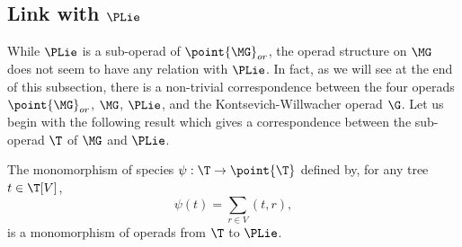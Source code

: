 \subsection{Link with \texorpdfstring{$\PLie$}{PLie}}
While $\PLie$ is a sub-operad of $\point{\MG}_{or}$, the operad structure on $\MG$ does not seem to have any 
relation with $\PLie$. In fact, as we will see at the end of this subsection, there is a non-trivial 
correspondence between the four operads $\point{\MG}_{or}$, $\MG$, $\PLie$, and the Kontsevich-Willwacher 
operad $\G$. Let us begin with the following result which gives a correspondence between the sub-operad $\T$ 
of $\MG$ and $\PLie$.

\begin{prop} \label{prop_prelie}
    The monomorphism of species $\psi : \T \to \point{\T}$ defined by, for any tree $t \in \T[V]$,
    \begin{equation}
        \psi(t) =  \sum_{r \in V} (t, r),
    \end{equation}
    is a monomorphism of operads from $\T$ to $\PLie$.
\end{prop}

